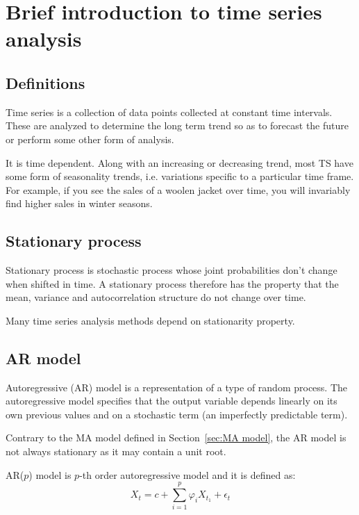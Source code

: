 
\chapter{Brief introduction to time series analysis}
\label{chap:Brief introduction to time series analysis}

\section{Definitions}
\label{sec:Definitions}

Time series is a collection of data points collected at constant time intervals. These are analyzed to determine the long term trend so as to forecast the future or perform some other form of analysis.

It is time dependent. Along with an increasing or decreasing trend, most TS have some form of seasonality trends, i.e. variations specific to a particular time frame. For example, if you see the sales of a woolen jacket over time, you will invariably find higher sales in winter seasons.

\section{Stationary process}
\label{sec:Stationary process}

Stationary process is stochastic process whose joint probabilities don't change when shifted in time. A stationary process therefore has the property that the mean, variance and autocorrelation structure do not change over time.

Many time series analysis methods depend on stationarity property.

\section{AR model}
\label{sec:AR model}

Autoregressive (AR) model is a representation of a type of random process. The autoregressive model specifies that the output variable depends linearly on its own previous values and on a stochastic term (an imperfectly predictable term).

Contrary to the MA model defined in Section~\ref{sec:MA model}, the AR model is not always stationary as it may contain a unit root.

AR($p$) model is $p$-th order autoregressive model and it is defined as:
\begin{equation*}
  X_t = c + \sum_{i=1}^p{\varphi_i X_{t_1}} + \epsilon_t
\end{equation*}

